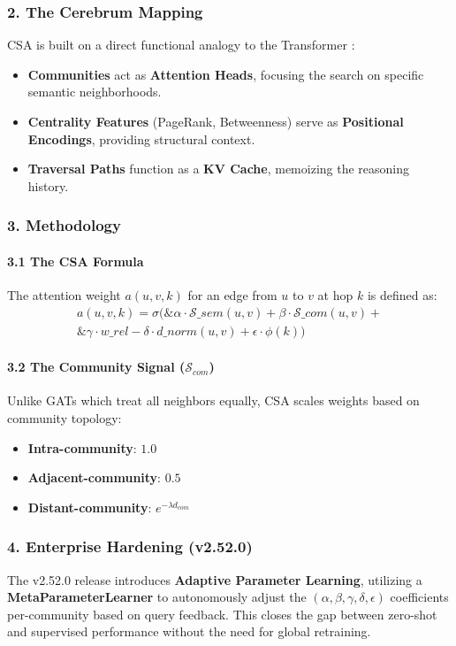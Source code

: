 \subsubsection{2. The Cerebrum Mapping}
CSA is built on a direct functional analogy to the Transformer \cite{vaswani2017attention}:
\begin{itemize}
\item \textbf{Communities} act as \textbf{Attention Heads}, focusing the search on specific semantic neigh\-borhoods.
\item \textbf{Centrality Features} (PageRank, Betweenness) serve as \textbf{Positional Encodings}, providing structural context.
\item \textbf{Traversal Paths} function as a \textbf{KV Cache}, memoizing the reasoning history.

\end{itemize}
\subsubsection{3. Methodology}

\paragraph{3.1 The CSA Formula}
The attention weight $a(u,v,k)$ for an edge from $u$ to $v$ at hop $k$ is defined as:
$$\begin{aligned}
a(u,v,k) = \sigma( \& \alpha \cdot \mathcal{S}\_{sem}(u,v) + \beta \cdot \mathcal{S}\_{com}(u,v) + \\
\& \gamma \cdot w\_{rel} - \delta \cdot d\_{norm}(u,v) + \epsilon \cdot \phi(k) )
\end{aligned}$$

\paragraph{3.2 The Community Signal ($\mathcal{S}_{com}$)}
Unlike GATs \cite{velickovic2018gat} which treat all neighbors equally, CSA scales weights based on community topology:
\begin{itemize}
\item \textbf{Intra-community}: $1.0$
\item \textbf{Adjacent-community}: $0.5$
\item \textbf{Distant-community}: $e^{-\lambda d_{com}}$

\end{itemize}
\subsubsection{4. Enterprise Hardening (v2.52.0)}
The v2.52.0 release introduces \textbf{Adaptive Parameter Learning}, utilizing a \textbf{MetaParameterLearner} to auton\-omously adjust the $(\alpha, \beta, \gamma, \delta, \epsilon)$ coeff\-icients per-community based on query feedback. This closes the gap between zero-shot and supervised performance without the need for global retraining.

